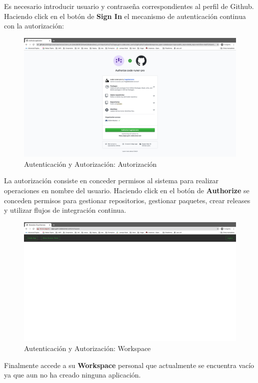 \documentclass[a4paper,11pt]{book}
\begin{document}
Es necesario introducir usuario y contraseña correspondientes al perfil de Github. Haciendo click en el botón de  \textbf{Sign In} el mecanismo de autenticación continua con la autorización: 

\begin{figure}[H]
\centering
\includegraphics[scale=0.2]{imagenes/casouso/3.png}
\caption{  Autenticación y Autorización: Autorización }
\end{figure}

La autorización consiste en conceder permisos al sistema para realizar operaciones en nombre del usuario. Haciendo click en el botón de \textbf{Authorize} se conceden permisos para gestionar repositorios, gestionar paquetes, crear releases y utilizar flujos de integración continua. 

\begin{figure}[H]
\centering
\includegraphics[scale=0.2]{imagenes/casouso/4.png}
\caption{ Autenticación y Autorización: Workspace  }
\end{figure}

Finalmente accede a su \textbf{Workspace} personal que actualmente se encuentra vacío ya que aun no ha creado ninguna aplicación. 
\end{document}
